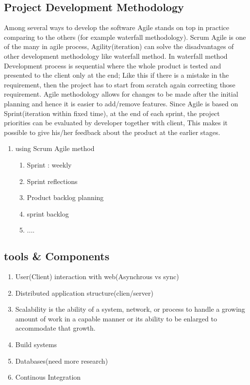 \subsection{Project Development Methodology} %
Among several ways to develop the software Agile stands on top in practice comparing to the others (for example waterfall methodology). Scrum Agile is one of the many in agile process, Agility(iteration) can solve the disadvantages of other development methodology like waterfall method. In waterfall method Development process is sequential where the whole product is tested and presented to the client only at the end; Like this if there is a mistake in the requirement, then the project has to start from scratch again correcting those requirement. Agile methodology allows for changes to be made after the initial planning and hence it is easier to add/remove features. Since Agile is based on Sprint(iteration within fixed time), at the end of each sprint, the project priorities can be evaluated by developer together with client, This makes it possible to give his/her feedback about the product at the earlier stages. 
\begin{enumerate}
	\item using Scrum Agile method
	\begin{enumerate}
		\item Sprint : weekly
		\item Sprint reflections
		\item Product backlog planning
		\item sprint backlog
		\item ....
	\end{enumerate}
\end{enumerate} 
\subsection{tools \& Components}
\begin{enumerate}
	\item User(Client) interaction with web(Asynchrous vs sync)
	\item Distributed application structure(clien/server)
	\item Scalability is the ability of a system, network, or process to handle a growing amount of work in a capable manner or its ability to be enlarged to accommodate that growth.
	\item Build systems
	\item Databases(need more research)
	\item Continous Integration
\end{enumerate}
